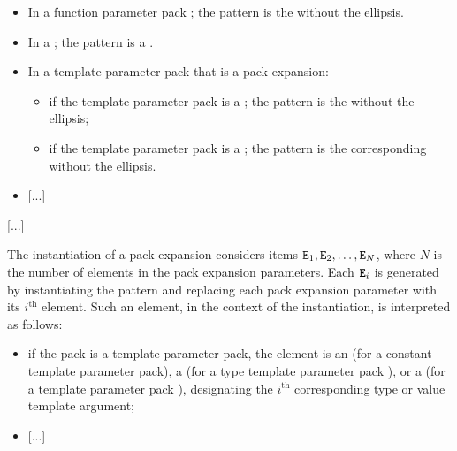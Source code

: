 \documentclass{wg21}
\begin{document}
\begin{itemize}
\item In a function parameter pack ; the pattern is the
 without the ellipsis.

\item In a  ;
the pattern is a .

\item In a template parameter pack that is a pack expansion:
\begin{itemize}
    \item
    if the template parameter pack is a ;
    the pattern is the  without the ellipsis;

    \item
    if the template parameter pack is a ;
    the pattern is the corresponding 
    without the ellipsis. %

\end{itemize}

\item \textcolor{noteclr}{[...]}
\end{itemize}

\textcolor{noteclr}{[...]}

\pnum
The instantiation of a pack expansion considers
items $\texttt{E}_1, \texttt{E}_2, \dotsc, \texttt{E}_N$,
where
$N$ is the number of elements in the pack expansion parameters.
Each $\texttt{E}_i$ is generated by instantiating the pattern and
replacing each pack expansion parameter with its $i^\text{th}$ element.
Such an element, in the context of the instantiation, is interpreted as
follows:
\begin{itemize}
    \item
    if the pack is a template parameter pack, the element is
    an 
    (for a constant template parameter pack),
    a 
    (for a type template parameter pack ), or
    a 
    (for a  template parameter pack ),
    designating the $i^\text{th}$ corresponding type or value template argument;

\item \textcolor{noteclr}{[...]}
\end{itemize}
\end{document}
